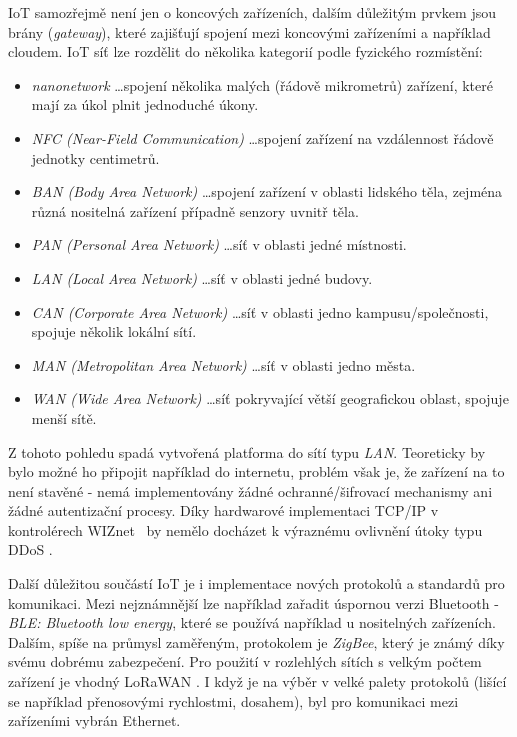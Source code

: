IoT samozřejmě není jen o koncových zařízeních, dalším důležitým prvkem jsou brány (\textit{gateway}), které zajišťují spojení mezi koncovými zařízeními a například cloudem. IoT síť lze rozdělit do několika kategorií \cite{iot_geographic} podle fyzického rozmístění:
\begin{itemize}
  \item \textit{nanonetwork} \ldots spojení několika malých (řádově mikrometrů) zařízení, které mají za úkol plnit jednoduché úkony.
  \item \textit{NFC (Near-Field Communication)} \ldots spojení zařízení na vzdálennost řádově jednotky centimetrů.
  \item \textit{BAN (Body Area Network)} \ldots spojení zařízení v oblasti lidského těla, zejména různá nositelná zařízení případně senzory uvnitř těla.
  \item \textit{PAN (Personal Area Network)} \ldots síť v oblasti jedné místnosti.
  \item \textit{LAN (Local Area Network)} \ldots síť v oblasti jedné budovy.
  \item \textit{CAN (Corporate Area Network)} \ldots síť v oblasti jedno kampusu/společnosti, spojuje několik lokální sítí.
  \item \textit{MAN (Metropolitan Area Network)} \ldots síť v oblasti jedno města.
  \item \textit{WAN (Wide Area Network)} \ldots síť pokryvající větší geografickou oblast, spojuje menší sítě.
\end{itemize}
Z tohoto pohledu spadá vytvořená platforma do sítí typu \textit{LAN}. Teoreticky by bylo možné ho připojit například do internetu, problém však je, že zařízení na to není stavěné - nemá implementovány žádné ochranné/šifrovací mechanismy ani žádné autentizační procesy. Díky hardwarové implementaci TCP/IP v kontrolérech WIZnet~\cite{datasheet_w5100} by nemělo docházet k výraznému ovlivnění útoky typu DDoS \cite{ArdIotDDOS}.

Další důležitou součástí IoT je i implementace nových protokolů a standardů pro komunikaci. Mezi nejznámnější lze například zařadit úspornou verzi Bluetooth - \textit{BLE: Bluetooth low energy}, které se používá například u nositelných zařízeních. Dalším, spíše na průmysl zaměřeným, protokolem je \textit{ZigBee}, který je známý díky svému dobrému zabezpečení. Pro použití v rozlehlých sítích s velkým počtem zařízení je vhodný LoRaWAN \cite{IoTprotocols}. I když je na výběr v velké palety  protokolů (lišící se například přenosovými rychlostmi, dosahem), byl pro komunikaci mezi zařízeními vybrán Ethernet.

